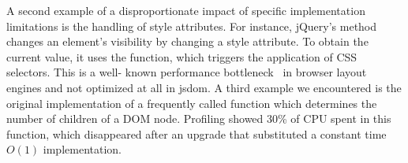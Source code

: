 A second example of a disproportionate impact of specific implementation
limitations is the handling of style attributes. For instance, jQuery's
 method changes an element's visibility by changing a style
attribute.  To obtain the current value, it uses the 
function, which triggers the application of CSS selectors. This is a well-
known performance bottleneck~\cite{Meyerovich+:WWW2010} in browser layout
engines and not optimized at all in jsdom.  A third example we encountered  is
the original implementation of a frequently called function
 which determines the number of children of a
DOM node.  Profiling showed 30\% of CPU spent in this function, which
disappeared after an upgrade that substituted a constant time $O(1)$
implementation.
